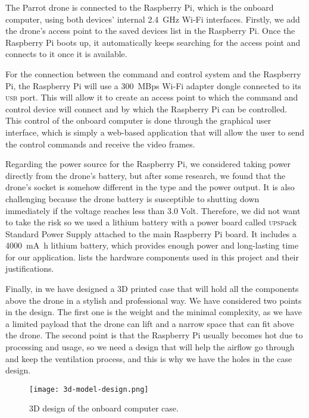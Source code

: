 \documentclass[../main.tex]{subfiles}
\begin{document}
The Parrot \anafi drone is connected 
to the Raspberry Pi, which is the onboard computer,
using both devices' internal 
\SI{2.4}{\giga\hertz}
Wi-Fi interfaces. 
Firstly, we add the \anafi drone's access point 
to the saved devices list in the Raspberry Pi.
Once the Raspberry Pi boots up, it automatically keeps 
searching for the access point and connects 
to it once it is available.

For the connection between the command and control system 
and the Raspberry Pi, 
the Raspberry Pi will use a 
\SI[per-mode=symbol,per-symbol=p]{300}{MBps} 
Wi-Fi adapter dongle connected to 
its \textsc{usb} port. 
This will allow it to create an access point to which 
the command and control device will connect and by which 
the Raspberry Pi can be controlled. This control of the 
onboard computer is done through the graphical user interface,
which is simply a web-based application 
that will allow the user to send the
control commands and receive the video frames. 


Regarding the power source for the Raspberry Pi, 
we considered taking power directly from the 
drone's battery, but after some research, we found 
that the \anafi drone's  
socket is somehow different in the type and the power output. It is also challenging 
because the drone battery is susceptible to shutting down 
immediately if the voltage reaches less than 3.0 Volt. 
Therefore, we did not want to take the risk so we used a 
lithium battery with a power board called 
\textsc{upsp}ack Standard Power Supply attached to 
the main Raspberry Pi board. It includes a 
\SI{4000}{\milli\ampere\hour}
lithium battery, which provides enough power 
and long-lasting time for our application.
 lists the hardware components
used in this project and their justifications. 

Finally, in  we have designed a 3D printed case that 
will hold all the components above the drone in 
a stylish and professional way. We have considered two 
points in the design. The first one is the weight and the minimal
complexity, as we have a limited payload that the drone 
can lift and a narrow space that can fit above the drone.
The second point is that the Raspberry Pi usually 
becomes hot due to processing and usage, so we need 
a design that will help the airflow go through and keep 
the ventilation process, and this is why we have 
the holes in the case design.   

\begin{figure}[h]
	\centering
	\texttt{[image: 3d-model-design.png]}
	\caption{3D design of the onboard computer case.}
	\label{fig:3d-design}
\end{figure}
\end{document}
